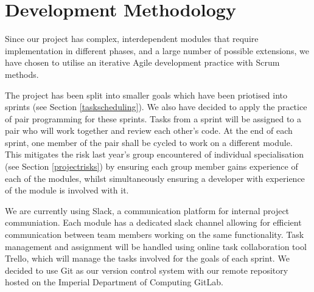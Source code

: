\section{Development Methodology} \label{developmentMethodology}

 Since our project has complex, interdependent modules that require implementation in different phases, and a large number of possible extensions, we have chosen to utilise an iterative Agile development practice with Scrum methods.

 The project has been split into smaller goals which have been priotised into sprints (see Section \ref{taskscheduling}). We also have decided to apply the practice of pair programming for these sprints. Tasks from a sprint will be assigned to a pair who will work together and review each other's code. At the end of each sprint, one member of the pair shall be cycled to work on a different module. This mitigates the risk last year's group encountered of individual specialisation (see Section \ref{projectrisks}) by ensuring each group member gains experience of each of the modules, whilst simultaneously ensuring a developer with experience of the module is involved with it.

We are currently using Slack, a communication platform for internal project communiation. Each module has a dedicated slack channel allowing for efficient communication between team members working on the same functionality. Task management and assignment will be handled using online task collaboration tool Trello, which will manage the tasks involved for the goals of each sprint. We decided to use Git as our version control system with our remote repository hosted on the Imperial Department of Computing GitLab. 